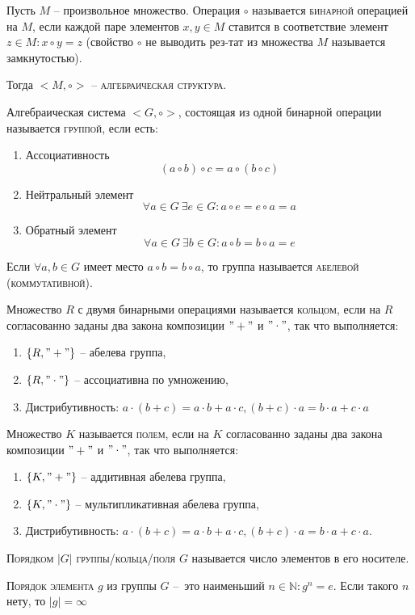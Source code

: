 \documentclass{article}
\begin{document}
Пусть $M$ – произвольное множество. Операция $\circ$ называется \textsc{бинарной} операцией на $M$, если каждой паре элементов
$x,y\in M$ ставится в соответствие элемент $z\in M\colon x\circ y=z$ (свойство $\circ$ не выводить рез-тат из множества $M$ называется замкнутостью).

Тогда $<M, \circ>$ – \textsc{алгебраическая структура}.

Алгебраическая система $<G, \circ>$, состоящая из одной бинарной операции называется \textsc{группой}, если есть:
\begin{enumerate}
\item Ассоциативность
$$(a\circ b)\circ c=a\circ(b\circ c)$$
\item Нейтральный элемент
$$\forall a\in G \ \exists e\in G\colon a\circ e=e\circ a=a$$
\item Обратный элемент
$$\forall a\in G \ \exists b\in G\colon a\circ b=b\circ a=e$$
\end{enumerate}

Если $\forall a,b\in G$ имеет место $a\circ b=b\circ a$, то группа называется \textsc{абелевой (коммутативной)}.

Множество $R$ с двумя бинарными операциями называется \textsc{кольцом}, если на $R$ согласованно заданы два закона композиции $"+"$ и $"\cdot"$, так что выполняется:
\begin{enumerate}
    \item $\{ R, "+"\}$ – абелева группа,
    \item $\{ R, "\cdot"\}$ – ассоциативна по умножению,
    \item Дистрибутивность: $a\cdot(b+c)=a\cdot b+a\cdot c, (b+c)\cdot a=b\cdot a+c\cdot a$
\end{enumerate}

Множество $K$ называется \textsc{полем}, если на $K$ согласованно заданы два закона композиции $"+"$ и $"\cdot"$, так что выполняется:
\begin{enumerate}
    \item $\{K, "+"\}$ – аддитивная абелева группа,
    \item $\{K, "\cdot"\}$ – мультипликативная абелева группа,
    \item Дистрибутивность: $a\cdot(b+c)=a\cdot b+a\cdot c, (b+c)\cdot a=b\cdot a+c\cdot a.$
\end{enumerate}

\textsc{Порядком {$|G|$} группы/кольца/поля {$G$}} называется число элементов в его носителе. 

\textsc{Порядок элемента {$g$}} из группы $G$ – это наименьший $n\in \mathbb{N}\colon g^n=e.$ Если такого $n$ нету, то $|g|=\infty$
\end{document}
